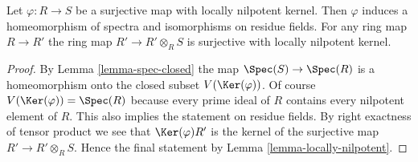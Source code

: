 \begin{lemma}
\label{lemma-surjective-locally-nilpotent-kernel}
Let $\varphi : R \to S$ be a surjective map with locally nilpotent kernel.
Then $\varphi$ induces a homeomorphism of spectra and isomorphisms
on residue fields. For any ring map $R \to R'$ the ring map
$R' \to R' \otimes_R S$ is surjective with locally nilpotent kernel.
\end{lemma}

\begin{proof}
By Lemma \ref{lemma-spec-closed} the map $\Spec(S) \to \Spec(R)$ is
a homeomorphism onto the closed subset $V(\Ker(\varphi))$. Of course
$V(\Ker(\varphi)) = \Spec(R)$ because every prime ideal of $R$ contains
every nilpotent element of $R$. This also implies the statement on
residue fields. By right exactness of tensor product we see that
$\Ker(\varphi)R'$ is the kernel of the surjective map $R' \to R' \otimes_R S$.
Hence the final statement by Lemma \ref{lemma-locally-nilpotent}.
\end{proof}